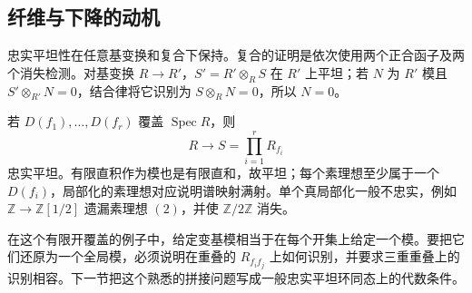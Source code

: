 \subsection{纤维与下降的动机}
\label{b3:subsec:1205:03}

忠实平坦性在任意基变换和复合下保持。复合的证明是依次使用两个正合函子及两个消失检测。对基变换 \(R\to R'\)，\(S'=R'\otimes_RS\) 在 \(R'\) 上平坦；若 \(N\) 为 \(R'\) 模且 \(S'\otimes_{R'}N=0\)，结合律将它识别为 \(S\otimes_RN=0\)，所以 \(N=0\)。

\ProseParagraphBreak
若 \(D(f_1),\ldots,D(f_r)\) 覆盖 \(\operatorname{Spec}R\)，则
\[
	R\longrightarrow S=\prod_{i=1}^rR_{f_i}
\]
忠实平坦。有限直积作为模也是有限直和，故平坦；每个素理想至少属于一个 \(D(f_i)\)，局部化的素理想对应说明谱映射满射。单个真局部化一般不忠实，例如 \(\mathbb Z\to\mathbb Z[1/2]\) 遗漏素理想 \((2)\)，并使 \(\mathbb Z/2\mathbb Z\) 消失。

\ProseParagraphBreak
在这个有限开覆盖的例子中，给定变基模相当于在每个开集上给定一个模。要把它们还原为一个全局模，必须说明在重叠的 \(R_{f_if_j}\) 上如何识别，并要求三重重叠上的识别相容。下一节把这个熟悉的拼接问题写成一般忠实平坦环同态上的代数条件。
